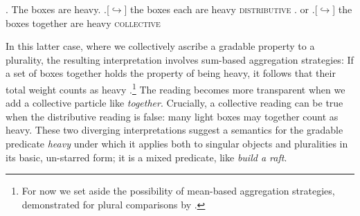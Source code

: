 \documentclass[linguex]{sp}
\begin{document}
\ex. The boxes are heavy.
\a.[$\hookrightarrow$] the boxes each are heavy \hfill \textsc{distributive}
\z. or
\a.[$\hookrightarrow$] the boxes together are heavy \hfill \textsc{collective}

In this latter case, where we collectively ascribe a gradable property to a plurality, the resulting interpretation involves sum-based aggregation strategies: If a set of boxes together holds the property of being heavy, it follows that their total weight counts as heavy \citep{scha1984}.\footnote{For now we set aside the possibility of mean-based aggregation strategies, demonstrated for plural comparisons by \cite{scontrasetal2012}.} The reading becomes more transparent when we add a collective particle like \emph{together}. Crucially, a collective reading can be true when the distributive reading is false: many light boxes may together count as heavy. These two diverging interpretations suggest a semantics for the gradable predicate \emph{heavy} under which it applies both to singular objects and pluralities in its basic, un-starred form; it is a mixed predicate, like \emph{build a raft}. 
\end{document}
